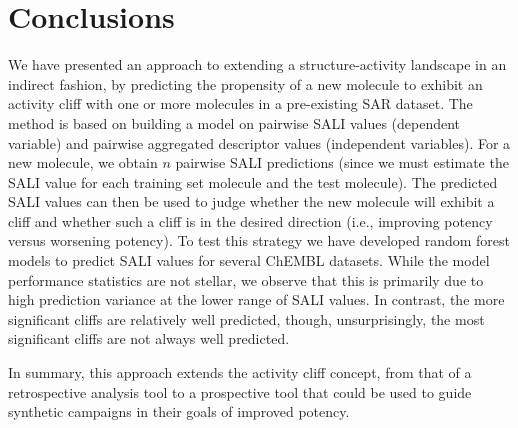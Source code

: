 \documentclass[letterpaper, 12pt]{article}
\begin{document}
\section{Conclusions}
\label{sec:conclusions}

We have presented an approach to extending a structure-activity landscape in an indirect fashion, by
predicting the propensity of a new molecule to exhibit an activity cliff with one or more molecules
in a pre-existing SAR dataset. The method is based on building a model on pairwise SALI values
(dependent variable) and pairwise aggregated descriptor values (independent variables). For a new
molecule, we obtain $n$ pairwise SALI predictions (since we must estimate the SALI value for each
training set molecule and the test molecule). The predicted SALI values can then be used to judge
whether the new molecule will exhibit a cliff and whether such a cliff is in the desired direction
(i.e., improving potency versus worsening potency). To test this strategy we have developed random
forest models to predict SALI values for several ChEMBL datasets. While the model performance
statistics are not stellar, we observe that this is primarily due to high prediction variance at the
lower range of SALI values. In contrast, the more significant cliffs are relatively well predicted,
though, unsurprisingly, the most significant cliffs are not always well predicted.

In summary, this approach extends the activity cliff concept, from that of a retrospective analysis
tool to a prospective tool that could be used to guide synthetic campaigns in their goals of
improved potency.

\clearpage
\newpage

\end{document}
